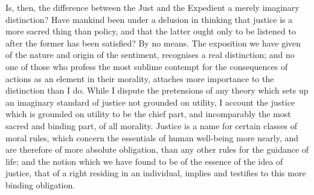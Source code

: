 \documentclass[12pt]{report}
\begin{document}
Is, then, the difference between the Just and the Expedient a merely imaginary distinction? Have mankind been under a delusion in thinking that justice is a more sacred thing than policy, and that the latter ought only to be listened to after the former has been satisfied? By no means. The exposition we have given of the nature and origin of the sentiment, recognises a real distinction; and no one of those who profess the most sublime contempt for the consequences of actions as an element in their morality, attaches more importance to the distinction than I do. While I dispute the pretensions of any theory which sets up an imaginary standard of justice not grounded on utility, I account the justice which is grounded on utility to be the chief part, and incomparably the most sacred and binding part, of all morality. Justice is a name for certain classes of moral rules, which concern the essentials of human well-being more nearly, and are therefore of more absolute obligation, than any other rules for the guidance of life; and the notion which we have found to be of the essence of the idea of justice, that of a right residing in an individual, implies and testifies to this more binding obligation.
\end{document}
